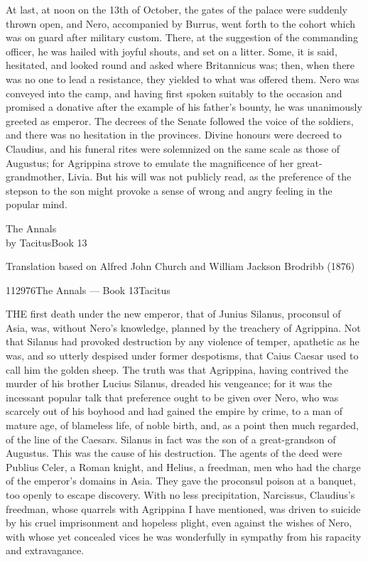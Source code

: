 
At last, at noon on the 13th of October, the gates of the palace were suddenly thrown open, and Nero, accompanied by Burrus, went forth to the cohort which was on guard after military custom. There, at the suggestion of the commanding officer, he was hailed with joyful shouts, and set on a litter. Some, it is said, hesitated, and looked round and asked where Britannicus was; then, when there was no one to lead a resistance, they yielded to what was offered them. Nero was conveyed into the camp, and having first spoken suitably to the occasion and promised a donative after the example of his father's bounty, he was unanimously greeted as emperor. The decrees of the Senate followed the voice of the soldiers, and there was no hesitation in the provinces. Divine honours were decreed to Claudius, and his funeral rites were solemnized on the same scale as those of Augustus; for Agrippina strove to emulate the magnificence of her great-grandmother, Livia. But his will was not publicly read, as the preference of the stepson to the son might provoke a sense of wrong and angry feeling in the popular mind.


The Annals\\
by TacitusBook 13

Translation based on Alfred John Church and William Jackson Brodribb (1876)

112976The Annals — Book 13Tacitus


THE first death under the new emperor, that of Junius Silanus, proconsul of Asia, was, without Nero's knowledge, planned by the treachery of Agrippina. Not that Silanus had provoked destruction by any violence of temper, apathetic as he was, and so utterly despised under former despotisms, that Caius Caesar used to call him the golden sheep. The truth was that Agrippina, having contrived the murder of his brother Lucius Silanus, dreaded his vengeance; for it was the incessant popular talk that preference ought to be given over Nero, who was scarcely out of his boyhood and had gained the empire by crime, to a man of mature age, of blameless life, of noble birth, and, as a point then much regarded, of the line of the Caesars. Silanus in fact was the son of a great-grandson of Augustus. This was the cause of his destruction. The agents of the deed were Publius Celer, a Roman knight, and Helius, a freedman, men who had the charge of the emperor's domains in Asia. They gave the proconsul poison at a banquet, too openly to escape discovery. With no less precipitation, Narcissus, Claudius's freedman, whose quarrels with Agrippina I have mentioned, was driven to suicide by his cruel imprisonment and hopeless plight, even against the wishes of Nero, with whose yet concealed vices he was wonderfully in sympathy from his rapacity and extravagance.

